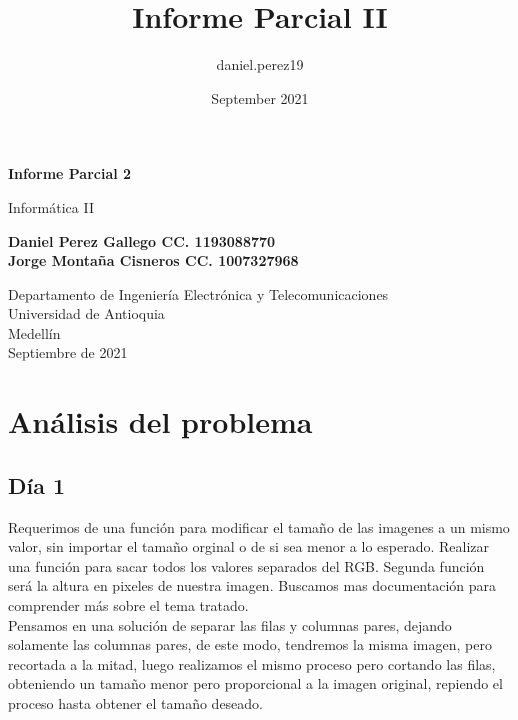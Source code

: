 \documentclass{article}
\title{Informe Parcial II}
\author{daniel.perez19 }
\date{September 2021}
\begin{document}
\begin{titlepage}
    \begin{center}
        \vspace*{1cm}
            
        \Huge
        \textbf{Informe Parcial 2}
            
        \vspace{0.5cm}
        \LARGE
        Informática II
            
        \vspace{1.5cm}
            
        \textbf{Daniel Perez Gallego CC. 1193088770\\Jorge Montaña Cisneros CC.  1007327968}
            
        \vfill
            
        \vspace{0.8cm}
            
        \Large
        Departamento de Ingeniería Electrónica y Telecomunicaciones\\
        Universidad de Antioquia\\
        Medellín\\
        Septiembre de 2021
            
    \end{center}
\end{titlepage}

\tableofcontents

\section{Análisis del problema}
\subsection{Día 1}
Requerimos de una función para modificar el tamaño de las imagenes a un mismo valor, sin importar el tamaño orginal o de si sea menor a lo esperado.
Realizar una función para sacar todos los valores separados del RGB.
Segunda función será la altura en pixeles de nuestra imagen. Buscamos mas documentación para comprender más sobre el tema tratado.\\

Pensamos en una solución de separar las filas y columnas pares, dejando solamente las columnas pares, de este modo, tendremos la misma imagen, pero recortada a la mitad, luego realizamos el mismo proceso pero cortando las filas, obteniendo un tamaño menor pero proporcional a la imagen original, repiendo el proceso hasta obtener el tamaño deseado.\\
\end{document}
